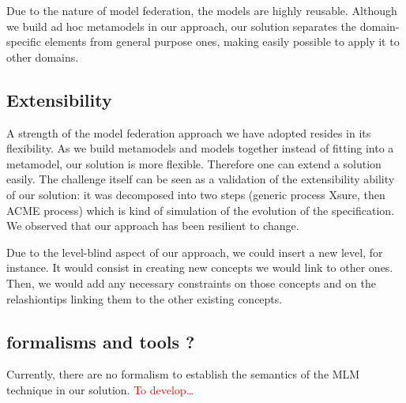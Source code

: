   Due to the nature of model federation, the models are highly reusable.
  Although we build ad hoc metamodels in our approach, our solution separates
  the domain-specific elements from general purpose ones, making easily
  possible to apply it to other domains. 

  \subsection{Extensibility}


  A strength of the  model federation approach we have adopted resides in its
  flexibility. As we build metamodels and models together instead of fitting
  into a metamodel, our solution is more flexible. Therefore one can extend a
  solution easily. The challenge itself can be seen as a validation of the
  extensibility ability of our solution: it was decomposed into two steps
  (generic process Xsure, then ACME process) which is kind of simulation of the
  evolution of the  specification. We observed that our approach has been
  resilient to change.

  Due to the level-blind aspect of our approach, we could insert a new level,
  for instance. It would consist in creating new concepts we would link to
  other ones. Then, we would add any necessary constraints on those concepts
  and on the relashiontips linking them to the other existing concepts. 


  
\subsection{formalisms and tools ?}



Currently, there are no formalism to establish the semantics of the MLM
technique in our solution. \textcolor{red}{To develop…}

